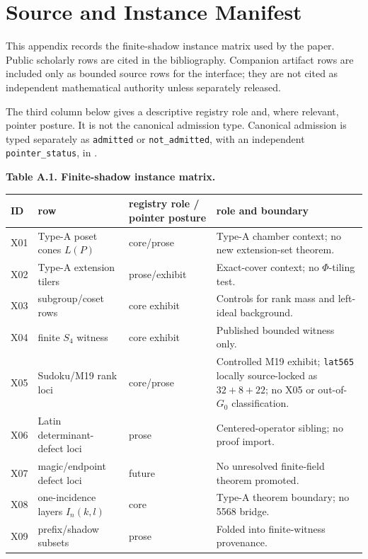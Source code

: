 \section{Source and Instance Manifest}
\label{app:source-manifest}

This appendix records the finite-shadow instance matrix used by the paper.  Public scholarly rows are cited in the bibliography.  Companion artifact rows are included only as bounded source rows for the interface; they are not cited as independent mathematical authority unless separately released.

The third column below gives a descriptive registry role and, where relevant, pointer posture.  It is not the canonical admission type.  Canonical admission is typed separately as \texttt{admitted} or \texttt{not\_admitted}, with an independent \texttt{pointer\_status}, in .

\smallskip
\noindent\textbf{Table A.1. Finite-shadow instance matrix.}
\smallskip

\begingroup
\scriptsize
\setlength{\tabcolsep}{3pt}
\renewcommand{\arraystretch}{0.84}

\begin{center}
\begin{tabular}{@{}L{0.07\textwidth}L{0.30\textwidth}L{0.18\textwidth}L{0.36\textwidth}@{}}
\toprule
ID & row & registry role / pointer posture & role and boundary \\
\midrule
X01 & Type-A poset cones \(L(P)\) & core/prose & Type-A chamber context; no new extension-set theorem. \\
X02 & Type-A extension tilers & prose/exhibit & Exact-cover context; no \(\Phi\)-tiling test. \\
X03 & subgroup/coset rows & core exhibit & Controls for rank mass and left-ideal background. \\
X04 & finite \(S_4\) witness & core exhibit & Published bounded witness only. \\
X05 & Sudoku/M19 rank loci & core/prose & Controlled M19 exhibit; \texttt{lat565} locally source-locked as \(32+8+22\); no X05 or out-of-\(G_0\) classification. \\
X06 & Latin determinant-defect loci & prose & Centered-operator sibling; no proof import. \\
X07 & magic/endpoint defect loci & future & No unresolved finite-field theorem promoted. \\
X08 & one-incidence layers \(I_n(k,l)\) & core & Type-A theorem boundary; no 5568 bridge. \\
X09 & prefix/shadow subsets & prose & Folded into finite-witness provenance. \\
\bottomrule
\end{tabular}
\end{center}

